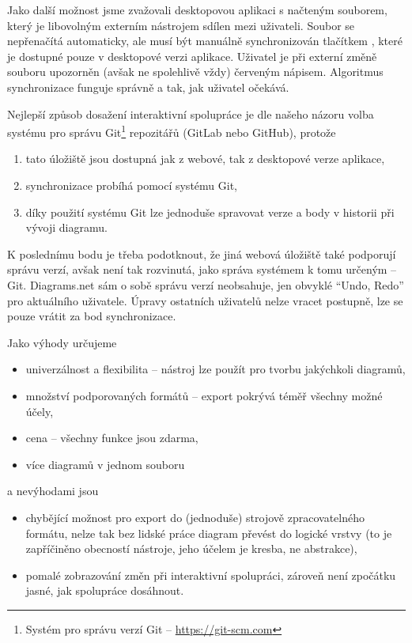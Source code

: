 Jako další možnost jsme zvažovali desktopovou aplikaci s načteným souborem, který je libovolným externím nástrojem sdílen mezi uživateli.
Soubor se nepřenačítá automaticky, ale musí být manuálně synchronizován tlačítkem , které je dostupné pouze v desktopové verzi aplikace.
Uživatel je při externí změně souboru upozorněn (avšak ne spolehlivě vždy) červeným nápisem.
Algoritmus synchronizace funguje správně a tak, jak uživatel očekává.

Nejlepší způsob dosažení interaktivní spolupráce je dle našeho názoru volba systému pro správu Git\footnote{Systém pro správu verzí Git -- \url{https://git-scm.com}} repozitářů (GitLab nebo GitHub), protože
\begin{enumerate}
  \item tato úložiště jsou dostupná jak z webové, tak z desktopové verze aplikace,
  \item synchronizace probíhá pomocí systému Git,
  \item díky použití systému Git lze jednoduše spravovat verze a body v historii při vývoji diagramu.
\end{enumerate}

K poslednímu bodu je třeba podotknout, že jiná webová úložiště také podporují správu verzí, avšak není tak rozvinutá, jako správa systémem k tomu určeným -- Git.
Diagrams.net sám o sobě správu verzí neobsahuje, jen obvyklé \enquote{Undo, Redo} pro aktuálního uživatele.
Úpravy ostatních uživatelů nelze vracet postupně, lze se pouze vrátit za bod synchronizace.

Jako výhody určujeme
\begin{itemize}
  \item univerzálnost a flexibilita -- nástroj lze použít pro tvorbu jakýchkoli diagramů,
  \item množství podporovaných formátů -- export pokrývá téměř všechny možné účely,
  \item cena -- všechny funkce jsou zdarma,
  \item více diagramů v jednom souboru
\end{itemize}
a nevýhodami jsou
\begin{itemize}
  \item chybějící možnost pro export do (jednoduše) strojově zpracovatelného formátu, nelze tak bez lidské práce diagram převést do logické vrstvy (to je zapříčiněno obecností nástroje, jeho účelem je kresba, ne abstrakce),
  \item pomalé zobrazování změn při interaktivní spolupráci, zároveň není zpočátku jasné, jak spolupráce dosáhnout.
\end{itemize}

